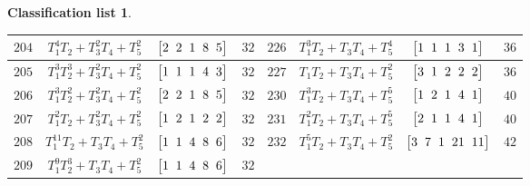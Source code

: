 \documentclass[pdftex]{sigma}%
\theoremstyle{definition}
\newtheorem{class-list}[thm]{Classification list}
\numberwithin{equation}{section}
\begin{document}
\begin{class-list}
\begin{table}[t!]
\begin{tabu}{c|c|c|c||c|c|c|c}
\\ \hline
${204}$&${T_{1}^{4}T_{2}+T_{3}^{2}T_{4}+T_{5}^{2}}$
&$\arraycolsep=1mm\begin{bmatrix}{2} & {2} & {1} & {8} & {5}\end{bmatrix}$&${32}$
&${226}$&${T_{1}^{3}T_{2}+T_{3}T_{4}+T_{5}^{4}}$
&$\arraycolsep=1mm\begin{bmatrix}{1} & {1} & {1} & {3} & {1}\end{bmatrix}$&${36}$
\\ \hline
${205}$&${T_{1}^{3}T_{2}^{3}+T_{3}^{2}T_{4}+T_{5}^{2}}$
&$\arraycolsep=1mm\begin{bmatrix}{1} & {1} & {1} & {4} & {3}\end{bmatrix}$&${32}$
&${227}$&${T_{1}T_{2}+T_{3}T_{4}+T_{5}^{2}}$
&$\arraycolsep=1mm\begin{bmatrix}{3} & {1} & {2} & {2} & {2}\end{bmatrix}$&${36}$
\\ \hline
${206}$&${T_{1}^{3}T_{2}^{2}+T_{3}^{2}T_{4}+T_{5}^{2}}$
&$\arraycolsep=1mm\begin{bmatrix}{2} & {2} & {1} & {8} & {5}\end{bmatrix}$&${32}$
&${230}$&${T_{1}^{3}T_{2}+T_{3}T_{4}+T_{5}^{5}}$
&$\arraycolsep=1mm\begin{bmatrix}{1} & {2} & {1} & {4} & {1}\end{bmatrix}$&${40}$
\\ \hline
${207}$&${T_{1}^{2}T_{2}+T_{3}^{2}T_{4}+T_{5}^{2}}$
&$\arraycolsep=1mm\begin{bmatrix}{1} & {2} & {1} & {2} & {2}\end{bmatrix}$&${32}$
&${231}$&${T_{1}^{2}T_{2}+T_{3}T_{4}+T_{5}^{5}}$
&$\arraycolsep=1mm\begin{bmatrix}{2} & {1} & {1} & {4} & {1}\end{bmatrix}$&${40}$
\\ \hline
${208}$&${T_{1}^{11}T_{2}+T_{3}T_{4}+T_{5}^{2}}$
&$\arraycolsep=1mm\begin{bmatrix}{1} & {1} & {4} & {8} & {6}\end{bmatrix}$&${32}$
&${232}$&${T_{1}^{5}T_{2}+T_{3}T_{4}+T_{5}^{2}}$
&$\arraycolsep=1mm\begin{bmatrix}{3} & {7} & {1} & {21} & {11}\end{bmatrix}$&${42}$
\\ \hline
${209}$&${T_{1}^{9}T_{2}^{3}+T_{3}T_{4}+T_{5}^{2}}$
&$\arraycolsep=1mm\begin{bmatrix}{1} & {1} & {4} & {8} & {6}\end{bmatrix}$&${32}$

\end{tabu}
\end{table}
\end{class-list}
\end{document}
